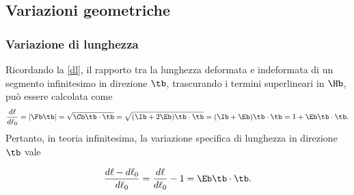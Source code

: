 %
%
%
%
%
%

\subsection{Variazioni geometriche}
\subsubsection{Variazione di lunghezza}
Ricordando la 	\eqref{dl}, il rapporto tra la lunghezza deformata e indeformata di un segmento infinitesimo in direzione $\tb$, trascurando i termini superlineari in $\Hb$, può essere calcolata come
\begin{equation}
\frac{d\ell}{d\ell_0}=|\Fb\tb|=\sqrt{\Cb\tb\cdot\tb}=\sqrt{(\Ib+2\Eb)\tb\cdot\tb}=(\Ib+\Eb)\tb\cdot\tb=1+\Eb\tb\cdot\tb.
\end{equation}
Pertanto, in teoria infinitesima, la variazione specifica di lunghezza in direzione $\tb$ vale
\begin{definition}
	\begin{equation}\label{Ett}
\frac{d\ell-d\ell_0}{d\ell_0}=\frac{d\ell}{d\ell_0}-1=\Eb\tb\cdot\tb.
\end{equation}
\end{definition}

